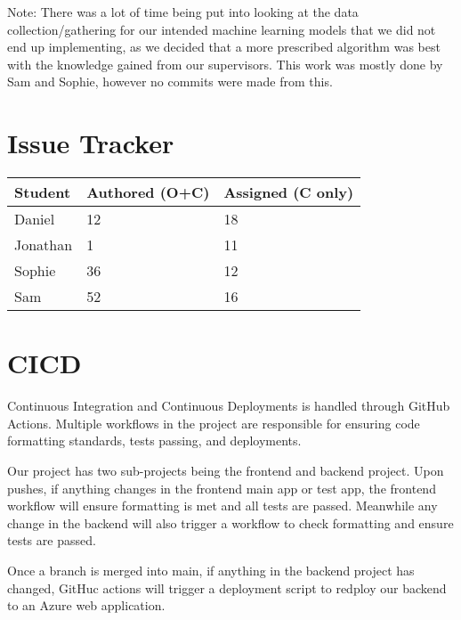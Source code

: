 \documentclass{article}
\begin{document}
Note: There was a lot of time being put into looking at the data collection/gathering for our intended machine learning models that we did not end up implementing, as we decided that a more prescribed algorithm was best with the knowledge gained from our supervisors. This work was mostly done by Sam and Sophie, however no commits were made from this. 


\section{Issue Tracker}

\begin{table}[H]
\centering
\begin{tabular}{lll}
\toprule
\textbf{Student} & \textbf{Authored (O+C)} & \textbf{Assigned (C only)}\\
\midrule
Daniel & 12 & 18 \\
Jonathan & 1 & 11 \\
Sophie & 36 & 12 \\
Sam & 52 & 16 \\
\bottomrule
\end{tabular}
\end{table}


\section{CICD}

Continuous Integration and Continuous Deployments is handled through GitHub Actions. Multiple workflows in the project are responsible for ensuring code formatting standards, tests passing, and deployments. 

Our project has two sub-projects being the frontend and backend project. Upon pushes, if anything changes in the frontend main app or test app, the frontend workflow will ensure formatting is met and all tests are passed. Meanwhile any change in the backend will also trigger a workflow to check formatting and ensure tests are passed. 

Once a branch is merged into main, if anything in the backend project has changed, GitHuc actions will trigger a deployment script to redploy our backend to an Azure web application.
\end{document}

